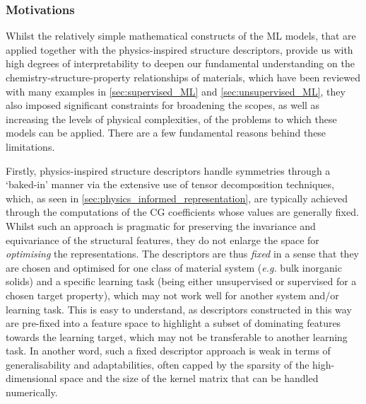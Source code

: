 \subsubsection{Motivations}

Whilst the relatively simple mathematical constructs of the ML models, that are applied together with the physics-inspired structure descriptors, provide us with high degrees of interpretability to deepen our fundamental understanding on the chemistry-structure-property relationships of materials, which have been reviewed with many examples in \cref{sec:supervised_ML} and \ref{sec:unsupervised_ML}, they also imposed significant constraints for broadening the scopes, as well as increasing the levels of physical complexities, of the problems to which these models can be applied. There are a few fundamental reasons behind these limitations. 

Firstly, physics-inspired structure descriptors handle symmetries through a `baked-in' manner via the extensive use of tensor decomposition techniques, which,  as seen in \cref{sec:physics_informed_representation}, are typically achieved through the computations of the CG coefficients whose values are generally fixed. Whilst such an approach is pragmatic for preserving the invariance and equivariance of the structural features, they do not enlarge the space for \emph{optimising} the representations. The descriptors are thus \emph{fixed} in a sense that they are chosen and optimised for one class of material system (\emph{e.g.} bulk inorganic solids) and a specific learning task (being either unsupervised or supervised for a chosen target property), which may not work well for another system and/or learning task. This is easy to understand, as descriptors constructed in this way are pre-fixed into a feature space to highlight a subset of dominating features towards the learning target, which may not be transferable to another learning task. In another word, such a fixed descriptor approach is weak in terms of generalisability and adaptabilities, often capped by the sparsity of the high-dimensional space\cite{beyer1999nearest} and the size of the kernel matrix that can be handled numerically. 

